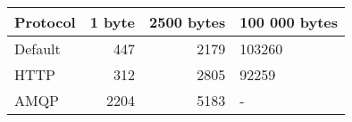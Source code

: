 \begin{tabularx}{\textwidth}{lrrl}
\hline
 Protocol   &   1 byte &   2500 bytes & 100 000 bytes   \\
\hline
 Default    &      447 &         2179 & 103260          \\
 HTTP       &      312 &         2805 & 92259           \\
 AMQP       &     2204 &         5183 & -               \\
\hline
\end{tabularx}